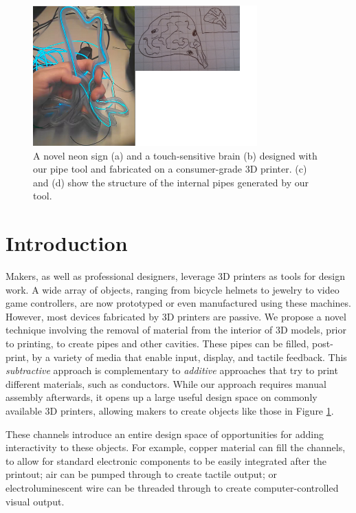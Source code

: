 \begin{figure}[h]
\centering
    \includegraphics[width=3.4in]{figures/placeholder/teaser.png}
\caption{A novel neon sign (a) and a touch-sensitive brain (b) designed with our pipe tool and fabricated on a consumer-grade 3D printer.  (c) and (d) show the structure of the internal pipes generated by our tool.  }
\label{fig:teaser}
\end{figure}

\section{Introduction}

Makers, as well as professional designers, leverage 3D printers as tools for design work.  A wide array of objects, ranging from bicycle helmets to jewelry to video game controllers, are now prototyped or even manufactured using these machines.  However, most devices fabricated by 3D printers are passive.  We propose a novel technique involving the removal of material from the interior of 3D models, prior to printing, to create pipes and other cavities.  These pipes can be filled, post-print, by a variety of media that enable input, display, and tactile feedback.  This {\em subtractive} approach is complementary to {\em additive} approaches that try to print different materials, such as conductors. While our approach requires manual assembly afterwards, it opens up a large useful design space on commonly available 3D printers, allowing makers to create objects like those in Figure \ref{fig:teaser}.

These channels introduce an entire design space of opportunities for adding interactivity to these objects. For example, copper material can fill the channels, to allow for standard electronic components to be easily integrated after the printout; air can be pumped through to create tactile output; or electroluminescent wire can be threaded through to create computer-controlled visual output.

